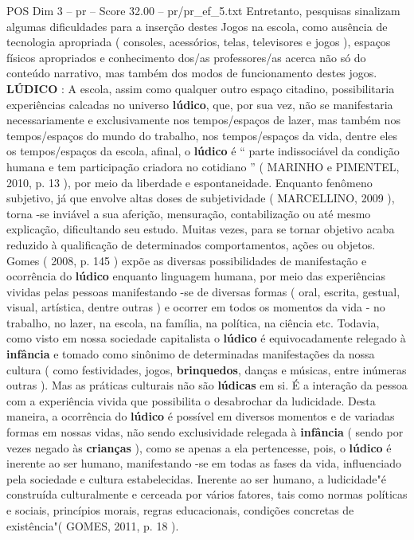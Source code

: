\begin{textsample}{POS Dim 3 – pr – Score 32.00 – pr/pr\_ef\_5.txt}
Entretanto, pesquisas sinalizam algumas dificuldades para a inserção destes Jogos na escola, como ausência de tecnologia apropriada ( consoles, acessórios, telas, televisores e jogos ), espaços físicos apropriados e conhecimento dos/as professores/as acerca não só do conteúdo narrativo, mas também dos modos de funcionamento destes jogos. \textbf{LÚDICO} : A escola, assim como qualquer outro espaço citadino, possibilitaria experiências calcadas no universo \textbf{lúdico}, que, por sua vez, não se manifestaria necessariamente e exclusivamente nos tempos/espaços de lazer, mas também nos tempos/espaços do mundo do trabalho, nos tempos/espaços da vida, dentre eles os tempos/espaços da escola, afinal, o \textbf{lúdico} é “ parte indissociável da condição humana e tem participação criadora no cotidiano ” ( MARINHO e PIMENTEL, 2010, p. 13 ), por meio da liberdade e espontaneidade.
Enquanto fenômeno subjetivo, já que envolve altas doses de subjetividade ( MARCELLINO, 2009 ), torna -se inviável a sua aferição, mensuração, contabilização ou até mesmo explicação, dificultando seu estudo.
Muitas vezes, para se tornar objetivo acaba reduzido à qualificação de determinados comportamentos, ações ou objetos.
Gomes ( 2008, p. 145 ) expõe as diversas possibilidades de manifestação e ocorrência do \textbf{lúdico} enquanto linguagem humana, por meio das experiências vividas pelas pessoas manifestando -se de diversas formas ( oral, escrita, gestual, visual, artística, dentre outras ) e ocorrer em todos os momentos da vida - no trabalho, no lazer, na escola, na família, na política, na ciência etc.
Todavia, como visto em nossa sociedade capitalista o \textbf{lúdico} é equivocadamente relegado à \textbf{infância} e tomado como sinônimo de determinadas manifestações da nossa cultura ( como festividades, jogos, \textbf{brinquedos}, danças e músicas, entre inúmeras outras ).
Mas as práticas culturais não são \textbf{lúdicas} em si.
É a interação da pessoa com a experiência vivida que possibilita o desabrochar da ludicidade.
Desta maneira, a ocorrência do \textbf{lúdico} é possível em diversos momentos e de variadas formas em nossas vidas, não sendo exclusividade relegada à \textbf{infância} ( sendo por vezes negado às \textbf{crianças} ), como se apenas a ela pertencesse, pois, o \textbf{lúdico} é inerente ao ser humano, manifestando -se em todas as fases da vida, influenciado pela sociedade e cultura estabelecidas.
Inerente ao ser humano, a ludicidade"é construída culturalmente e cerceada por vários fatores, tais como normas políticas e sociais, princípios morais, regras educacionais, condições concretas de existência"( GOMES, 2011, p. 18 ).

\end{textsample}
